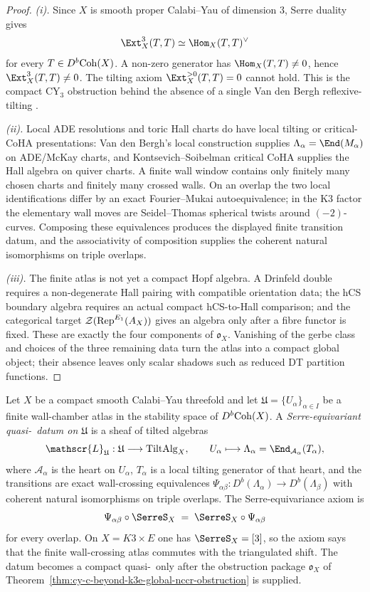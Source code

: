 \begin{proof}
\emph{(i).} Since $X$ is smooth proper Calabi--Yau of dimension $3$,
Serre duality gives
\[
 \Ext_X^3(T,T)\simeq \Hom_X(T,T)^\vee
\]
for every $T\in D^b\mathrm{Coh}(X)$. A non-zero generator has
$\Hom_X(T,T)\neq 0$, hence $\Ext_X^3(T,T)\neq 0$. The tilting axiom
$\Ext_X^{>0}(T,T)=0$ cannot hold. This is the compact CY$_3$ obstruction
behind the absence of a single Van den Bergh reflexive-tilting \NCCR.

\emph{(ii).} Local ADE resolutions and toric Hall charts do have local
tilting or critical-CoHA presentations: Van den Bergh's local
construction supplies $\Lambda_\alpha=\End(M_\alpha)$ on ADE/McKay
charts, and Kontsevich--Soibelman critical CoHA supplies the Hall
algebra on quiver charts. A finite wall window contains only finitely
many chosen charts and finitely many crossed walls. On an overlap the
two local identifications differ by an exact Fourier--Mukai
autoequivalence; in the K3 factor the elementary wall moves are
Seidel--Thomas spherical twists around $(-2)$-curves. Composing these
equivalences produces the displayed finite transition datum, and the
associativity of composition supplies the coherent natural
isomorphisms on triple overlaps.

\emph{(iii).} The finite atlas is not yet a compact Hopf algebra. A
Drinfeld double requires a non-degenerate Hall pairing with compatible
orientation data; the hCS boundary algebra requires an actual compact
hCS-to-Hall comparison; and the categorical target
$\mathcal Z(\mathrm{Rep}^{E_{1}}(A_X))$ gives an algebra only after a
fibre functor is fixed. These are exactly the four components of
$\mathfrak o_X$. Vanishing of the gerbe class and choices of the three
remaining data turn the atlas into a compact global object; their
absence leaves only scalar shadows such as reduced DT partition
functions.
\end{proof}

\begin{definition}
\label{def:cy-c-beyond-serre-equivariant-quasi-nccr}
Let $X$ be a compact smooth Calabi--Yau threefold and let
$\mathfrak U=\{U_\alpha\}_{\alpha\in I}$ be a finite wall-chamber
atlas in the stability space of $D^b\mathrm{Coh}(X)$. A
\emph{Serre-equivariant quasi-\NCCR\ datum on $\mathfrak U$} is a
sheaf of tilted algebras
\[
 \mathscr{L}_{\mathfrak U} : \mathfrak U \longrightarrow
 \mathrm{TiltAlg}_X,
 \qquad U_\alpha \longmapsto
 \Lambda_\alpha=\End_{\mathcal A_\alpha}(T_\alpha),
\]
where $\mathcal A_\alpha$ is the heart on $U_\alpha$, $T_\alpha$ is a
local tilting generator of that heart, and the transitions are exact
wall-crossing equivalences
$\Psi_{\alpha\beta}:D^b(\Lambda_\alpha)\to D^b(\Lambda_\beta)$ with
coherent natural isomorphisms on triple overlaps. The
Serre-equivariance axiom is
\[
 \Psi_{\alpha\beta}\circ \SerreS_X
 \;=\;
 \SerreS_X\circ \Psi_{\alpha\beta}
\]
for every overlap. On $X=K3\times E$ one has
$\SerreS_X=[3]$, so the axiom says that the finite wall-crossing
atlas commutes with the triangulated shift. The datum becomes a
compact quasi-\NCCR\ only after the obstruction package
$\mathfrak o_X$ of
Theorem~\ref{thm:cy-c-beyond-k3e-global-nccr-obstruction} is supplied.
\end{definition}

